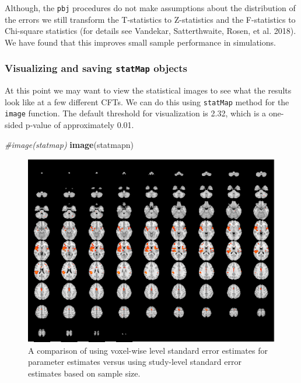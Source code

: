 \documentclass[]{article}
\newenvironment{Shaded}{\begin{snugshade}}{\end{snugshade}}
\newcommand{\KeywordTok}[1]{\textcolor[rgb]{0.13,0.29,0.53}{\textbf{#1}}}
\newcommand{\CommentTok}[1]{\textcolor[rgb]{0.56,0.35,0.01}{\textit{#1}}}
\newcommand{\NormalTok}[1]{#1}
\begin{document}
Although, the \texttt{pbj} procedures do not make assumptions about the
distribution of the errors we still transform the T-statistics to
Z-statistics and the F-statistics to Chi-square statistics (for details
see Vandekar, Satterthwaite, Rosen, et al. 2018). We have found that
this improves small sample performance in simulations.

\subsubsection{\texorpdfstring{Visualizing and saving \texttt{statMap}
objects}{Visualizing and saving statMap objects}}\label{visualizing-and-saving-statmap-objects}

At this point we may want to view the statistical images to see what the
results look like at a few different CFTs. We can do this using
\texttt{statMap} method for the \texttt{image} function. The default
threshold for visualization is 2.32, which is a one-sided p-value of
approximately 0.01.

\begin{Shaded}
\begin{Highlighting}[]
\CommentTok{#image(statmap)}
\KeywordTok{image}\NormalTok{(statmapn)}
\end{Highlighting}
\end{Shaded}

\begin{figure}
\centering
\includegraphics{introduction_to_pbj_files/figure-latex/unnamed-chunk-6-1.pdf}
\caption{A comparison of using voxel-wise level standard error estimates
for parameter estimates versus using study-level standard error
estimates based on sample size.}
\end{figure}
\end{document}
